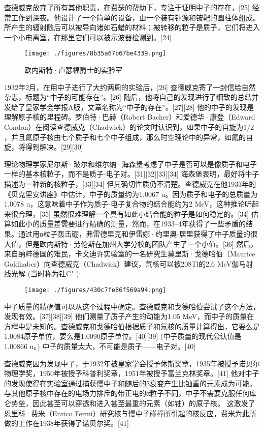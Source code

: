 查德威克放弃了所有其他职责，在费瑟的帮助下，专注于证明中子的存在，[25] 经常工作到深夜。他设计了一个简单的设备，由一个装有钋源和铍靶的圆柱体组成。所产生的辐射随后可以被导向诸如石蜡的材料；被转移的粒子是质子，它们将进入一个小电离室，在那里它们可以被示波器检测到。[24]
\begin{figure}[ht]
\centering
\texttt{[image: ./figures/8b35a67b67be4339.png]}
\caption{欧内斯特·卢瑟福爵士的实验室} \label{fig_CHFR_2}
\end{figure}
1932年2月，在用中子进行了大约两周的实验后，[26] 查德威克寄了一封信给自然杂志，标题为“中子的可能存在”。[26] 随后，他将自己的发现进行了细致的总结并发给了皇家学会学报A版，文章名称为“中子的存在”。[27][28] 他的中子的发现是理解原子核的里程碑。罗伯特·巴赫（Robert Bacher）和爱德华·康登（Edward Condon）在阅读查德威克（Chadwick）的论文时认识到，如果中子的自旋为$1/2$，并且氮原子核由七个质子和七个中子组成，那么时空理论中的异常，如氮的自旋，将得到解决。[29][30]

理论物理学家尼尔斯·玻尔和维尔纳·海森堡考虑了中子是否可以是像质子和电子一样的基本核粒子，而不是质子-电子对。[31][32][33][34] 海森堡表明，最好将中子描述为一种新的核粒子，[33][34] 但其确切性质仍不清楚。查德威克在他1933年的《贝克里安讲座》中估计，中子的质量约为1.0067 u。因为质子和电子的总质量为1.0078 u，这意味着中子作为质子-电子复合物的结合能约为2 MeV，这种推论听起来很合理，[35] 虽然很难理解一个具有如此小结合能的粒子是如何稳定的。[34] 估算如此小的质量差需要进行精确的测量，然而，在1933–4年获得了一些矛盾的结果。通过用α粒子轰击硼，弗雷德里克和伊雷娜·约里奥-居里获得了中子质量的很大值，但是欧内斯特·劳伦斯在加州大学分校的团队产生了一个小值。[36] 然后，来自纳粹德国的难民，卡文迪许实验室的一名研究生莫里斯·戈德哈伯（Maurice Goldhaber）向查德威克（Chadwick）建议，氘核可以被208Tl的2.6 MeV伽马射线光解 (当时称为钍C" ):
\begin{figure}[ht]
\centering
\texttt{[image: ./figures/430c7fe86f569a94.png]}
\caption \label{fig_CHFR_3}
\end{figure}
中子质量的精确值可以从这个过程中确定。查德威克和戈德哈伯尝试了这个方法，发现有效。[37][38][39] 他们测量了质子产生的动能为1.05 MeV，而中子的质量在方程中是未知的。查德威克和戈德哈伯根据质子和氘核的质量计算得出，它要么是1.0084原子单位，要么是1.0090原子单位。[40][39] (中子质量的现代公认值是1.00866 u。) 中子的质量太大，不可能是质子——电子对。[40]

查德威克因为发现中子，于1932年被皇家学会授予休斯奖章，1935年被授予诺贝尔物理学奖，1950年被授予科普利奖章，1951年被授予富兰克林奖章。[41] 他对中子的发现使得在实验室通过捕获慢中子和随后的β衰变产生比铀重的元素成为可能。与其他原子核中存在的电场力排斥的带正电的α粒子不同，中子不需要克服任何库仑势垒，因此甚至可以穿透和进入甚至最重的元素（如铀）的原子核。 这激发了恩里科·费米（Enrico Fermi）研究核与慢中子碰撞所引起的核反应，费米为此所做的工作在1938年获得了诺贝尔奖。[41]

